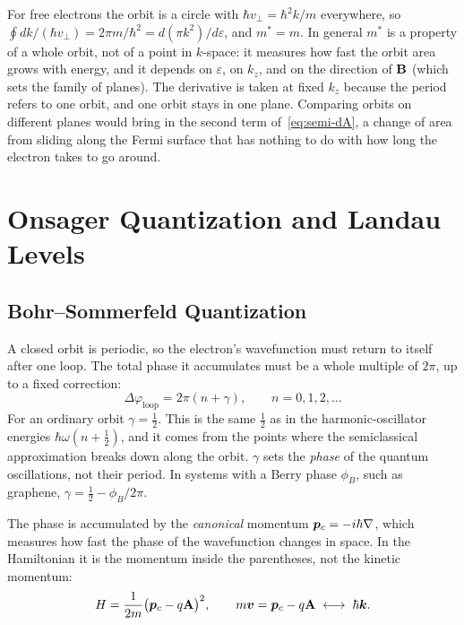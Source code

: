 For free electrons the orbit is a circle with $\hbar v_\perp = \hbar^2k/m$ everywhere, so $\oint dk/(\hbar v_\perp) = 2\pi m/\hbar^2 = d(\pi k^2)/d\varepsilon$, and $m^* = m$. In general $m^*$ is a property of a whole orbit, not of a point in $k$-space: it measures how fast the orbit area grows with energy, and it depends on $\varepsilon$, on $k_z$, and on the direction of $\cvect{B}$ (which sets the family of planes). The derivative is taken at fixed $k_z$ because the period refers to one orbit, and one orbit stays in one plane. Comparing orbits on different planes would bring in the second term of~\eqref{eq:semi-dA}, a change of area from sliding along the Fermi surface that has nothing to do with how long the electron takes to go around.

\section{Onsager Quantization and Landau Levels}
\label{sec:bloch-onsager}

\subsection{Bohr--Sommerfeld Quantization}

A closed orbit is periodic, so the electron's wavefunction must return to itself after one loop. The total phase it accumulates must be a whole multiple of $2\pi$, up to a fixed correction:
\begin{equation}
    \Delta\varphi_{\text{loop}} = 2\pi(n+\gamma), \qquad n = 0,1,2,\ldots
\end{equation}
For an ordinary orbit $\gamma = \tfrac12$. This is the same $\tfrac12$ as in the harmonic-oscillator energies $\hbar\omega(n+\tfrac12)$, and it comes from the points where the semiclassical approximation breaks down along the orbit. $\gamma$ sets the \emph{phase} of the quantum oscillations, not their period. In systems with a Berry phase $\phi_B$, such as graphene, $\gamma = \tfrac12 - \phi_B/2\pi$.

The phase is accumulated by the \emph{canonical} momentum $\bm{p}_c = -i\hbar\nabla$, which measures how fast the phase of the wavefunction changes in space. In the Hamiltonian it is the momentum inside the parentheses, not the kinetic momentum:
\begin{equation}
    H = \frac{1}{2m}\bigl(\lvect{p}_c - q\cvect{A}\bigr)^2,
    \qquad
    m\lvect{v} = \lvect{p}_c - q\cvect{A} \;\longleftrightarrow\; \hbar\lvect{k}.
\end{equation}

